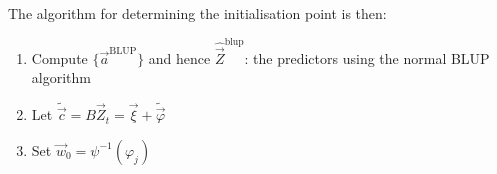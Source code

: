 \documentclass[]{article}
\begin{document}
{			The algorithm for determining the initialisation point is then:
			\begin{enumerate}
				\item Compute $\{ \vec{a}^\text{BLUP} \}$ and hence $\hat{\vec{Z}}^\text{blup}$: the predictors using the normal BLUP algorithm
				\item Let $\tilde{\vec{c}} = B \vec{Z}_t = \vec{\xi} + \tilde{\vec{\varphi}}$
				\item Set $\vec{w}_0 = \psi^{-1}\left(\varphi_j\right)$
			\end{enumerate}
			}
\end{document}
